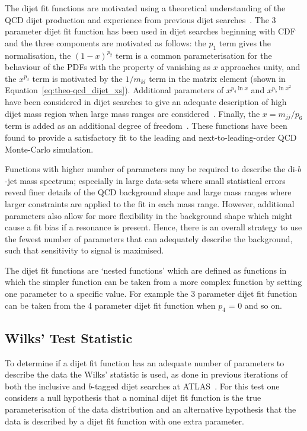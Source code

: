The dijet fit functions are motivated using a theoretical understanding of the QCD dijet production
and experience from previous dijet searches~\cite{theo-dijet_harris}.
The 3 parameter dijet fit function has been used in dijet searches beginning with CDF~\cite{dijet-CDF_3par}
and the three components are motivated as follows:
the $p_1$ term gives the normalisation,
the $(1-x)^{p_2}$ term is a common parameterisation for the behaviour of the PDFs with the property of vanishing as $x$ approaches unity,
and the $x^{p_3}$ term is motivated by the $1/m_{kl}$ term in the matrix element (shown in Equation~\ref{eq:theo-qcd_dijet_xs}).
Additional parameters of $x^{p_4\ln{x}}$ and $x^{p_5\ln{x}^{2}}$ have been considered in dijet searches to give an adequate description of
high dijet mass region when large mass ranges are considered~\cite{dijet-CDF_4par,dijet-mori16_int}.
Finally, the $x=m_{jj}/p_6$ term is added as an additional degree of freedom~\cite{det-thesis_kate}.
These functions have been found to provide a satisfactory fit to the leading and next-to-leading-order QCD Monte-Carlo simulation.

Functions with higher number of parameters may be required to describe the di-$b$-jet mass spectrum;
especially in large data-sets where small statistical errors reveal finer details of the QCD background shape
and large mass ranges where larger constraints are applied to the fit in each mass range.
However, additional parameters also allow for more flexibility in the background shape
which might cause a fit bias if a resonance is present.
Hence, there is an overall strategy to use the fewest number of parameters
that can adequately describe the background, such that sensitivity to signal is maximised.

The dijet fit functions are `nested functions'
which are defined as functions in which the simpler function can be taken from a more complex function by setting one parameter to a specific value.
For example the 3 parameter dijet fit function can be taken from the 4 parameter dijet fit function when $p_4$ = 0 and so on.

\subsection{Wilks' Test Statistic}
\label{sec:bkg-wilks}

To determine if a dijet fit function has an adequate number of parameters to describe the data the Wilks' statistic is used,
as done in previous iterations of both the inclusive and $b$-tagged dijet searches at ATLAS~\cite{dijet-mori16_paper,dibjet-mori16_paper}.
For this test one considers a null hypothesis that a nominal dijet fit function is the true parameterisation of the data distribution
and an alternative hypothesis that the data is described by a dijet fit function with one extra parameter.

